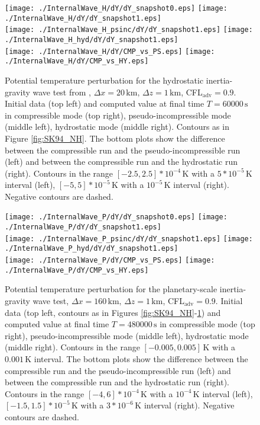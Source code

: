 \documentclass{ametsoc}
\theoremstyle{definition}
\begin{document}
\begin{figure}
\centering
 \texttt{[image: ./InternalWave\_H/dY/dY\_snapshot0.eps]}
 \texttt{[image: ./InternalWave\_H/dY/dY\_snapshot1.eps]}\\
 \texttt{[image: ./InternalWave\_H\_psinc/dY/dY\_snapshot1.eps]}
 \texttt{[image: ./InternalWave\_H\_hyd/dY/dY\_snapshot1.eps]}\\
  \texttt{[image: ./InternalWave\_H/dY/CMP\_vs\_PS.eps]}
 \texttt{[image: ./InternalWave\_H/dY/CMP\_vs\_HY.eps]}
 \caption{Potential temperature perturbation for the hydrostatic inertia-gravity wave test from \cite{SkamarockKlemp1994},  $\Delta x=20\,\textrm{km},\,\Delta z=1\,\textrm{km}$, CFL$_\textrm{adv}=0.9$. Initial data (top left) and computed value at final time $T=60000\,\textrm{s}$ in compressible mode (top right), pseudo-incompressible mode (middle left), hydrostatic mode (middle right). Contours as in Figure \ref{fig:SK94_NH}. The bottom plots show the difference between the compressible run and the pseudo-incompressible run (left) and between the compressible run and the hydrostatic run (right). Contours in the range $[-2.5, 2.5]*10^{-4}\,\textrm{K}$ with a $5*10^{-5}\,\textrm{K}$ interval (left), $[-5, 5]*10^{-5}\,\textrm{K}$  with a $10^{-5}\,\textrm{K}$ interval (right). Negative contours are dashed.}
 \label{fig:SK94_H} 
 \end{figure}

 \begin{figure}
\centering
 \texttt{[image: ./InternalWave\_P/dY/dY\_snapshot0.eps]}
 \texttt{[image: ./InternalWave\_P/dY/dY\_snapshot1.eps]}\\
 \texttt{[image: ./InternalWave\_P\_psinc/dY/dY\_snapshot1.eps]}
 \texttt{[image: ./InternalWave\_P\_hyd/dY/dY\_snapshot1.eps]}\\
  \texttt{[image: ./InternalWave\_P/dY/CMP\_vs\_PS.eps]}
 \texttt{[image: ./InternalWave\_P/dY/CMP\_vs\_HY.eps]}
 \caption{Potential temperature perturbation for the planetary-scale inertia-gravity wave test,  $\Delta x=160\,\textrm{km},\,\Delta z=1\,\textrm{km}$, CFL$_\textrm{adv}=0.9$. Initial data (top left, contours as in Figures \ref{fig:SK94_NH}-\ref{fig:SK94_H}) and computed value at final time $T=480000\,\textrm{s}$ in compressible mode (top right), pseudo-incompressible mode (middle left), hydrostatic mode (middle right). Contours in the range $[-0.005, 0.005]\,\textrm{K}$ with a $0.001\,\textrm{K}$ interval. The bottom plots show the difference between the compressible run and the pseudo-incompressible run (left) and between the compressible run and the hydrostatic run (right). Contours in the range $[-4, 6]*10^{-4}\,\textrm{K}$ with a $10^{-4}\,\textrm{K}$ interval (left), $[-1.5, 1.5]*10^{-5}\,\textrm{K}$ with a $3*10^{-6}\,\textrm{K}$ interval (right). Negative contours are dashed.}
 \label{fig:SK94_P} 
 \end{figure}
\end{document}
